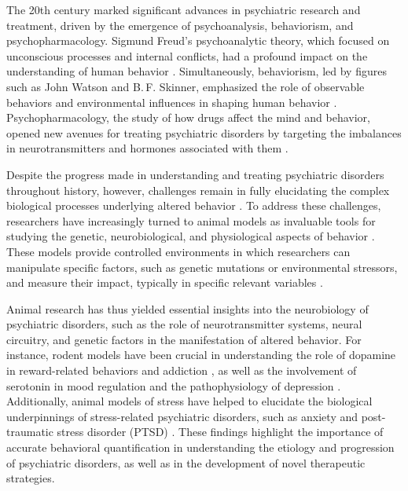 The 20th century marked significant advances in psychiatric research and treatment, driven by the emergence of psychoanalysis, behaviorism, and psychopharmacology. Sigmund Freud's psychoanalytic theory, which focused on unconscious processes and internal conflicts, had a profound impact on the understanding of human behavior \cite{Pick2015Psychoanalysis:Introduction}. Simultaneously, behaviorism, led by figures such as John Watson and B.\,F. Skinner, emphasized the role of observable behaviors and environmental influences in shaping human behavior \cite{Holland1978Behaviorism:Solution}. Psychopharmacology, the study of how drugs affect the mind and behavior, opened new avenues for treating psychiatric disorders by targeting the imbalances in neurotransmitters and hormones associated with them \cite{Rothschild2022Psychopharmacology:Basics}.

Despite the progress made in understanding and treating psychiatric disorders throughout history, however, challenges remain in fully elucidating the complex biological processes underlying altered behavior \cite{Harmer2017HowApproaches}. To address these challenges, researchers have increasingly turned to animal models as invaluable tools for studying the genetic, neurobiological, and physiological aspects of behavior \cite{Winship2019AnSchizophrenia, Varghese2017AutismModels, Wang2017TheDepression, Campos2013AnimalStress, Richter-Levin2019AnimalMet}. These models provide controlled environments in which researchers can manipulate specific factors, such as genetic mutations or environmental stressors, and measure their impact, typically in specific relevant variables \cite{Baker2020RodentPromises}.

Animal research has thus yielded essential insights into the neurobiology of psychiatric disorders, such as the role of neurotransmitter systems, neural circuitry, and genetic factors in the manifestation of altered behavior. For instance, rodent models have been crucial in understanding the role of dopamine in reward-related behaviors and addiction \cite{Wise2021DopamineAddiction}, as well as the involvement of serotonin in mood regulation and the pathophysiology of depression \cite{Borroto-Escuela2021TheProspects}. Additionally, animal models of stress have helped to elucidate the biological underpinnings of stress-related psychiatric disorders, such as anxiety and post-traumatic stress disorder (PTSD) \cite{Campos2013AnimalStress, Richter-Levin2019AnimalMet}. These findings highlight the importance of accurate behavioral quantification in understanding the etiology and progression of psychiatric disorders, as well as in the development of novel therapeutic strategies.

